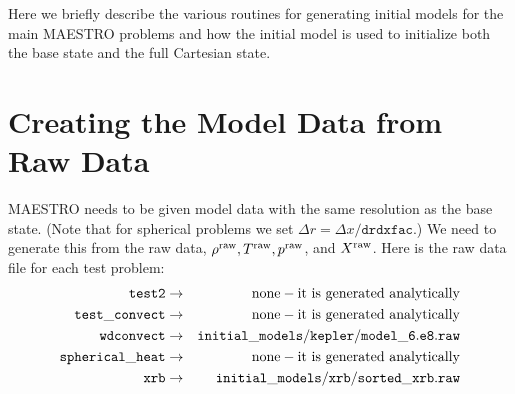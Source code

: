 Here we briefly describe the various routines for generating initial models
for the main MAESTRO problems and how the initial model is used to initialize
both the base state and the full Cartesian state.


\section{Creating the Model Data from Raw Data}\label{Sec:Creating the Model Data from Raw Data}
\label{sec:initial_models_main}

MAESTRO needs to be given model data with the same resolution as the base state.
(Note that for spherical problems we set 
$\Delta r = \Delta x/\mathtt{drdxfac}$.)  
We need to generate this from the raw data,
 $\rho^{\rm raw}, T^{\rm raw}, p^{\rm raw}$, and
$X^{\rm raw}$.  Here is the raw data file for each test problem:
\begin{eqnarray}
{\tt test2} & \rightarrow & \mathrm{none-it~ is~ generated~ analytically} \nonumber \nonumber \\
{\tt test\_convect} & \rightarrow & \mathrm{none-it~ is~ generated~ analytically} \nonumber \nonumber \\
{\tt wdconvect} & \rightarrow & {\tt initial\_models/kepler/model\_6.e8.raw} \nonumber \\
{\tt spherical\_heat} & \rightarrow & \mathrm{none-it~ is~ generated~ analytically} \nonumber \\
{\tt xrb} & \rightarrow & {\tt initial\_models/xrb/sorted\_xrb.raw} \nonumber
\end{eqnarray}

